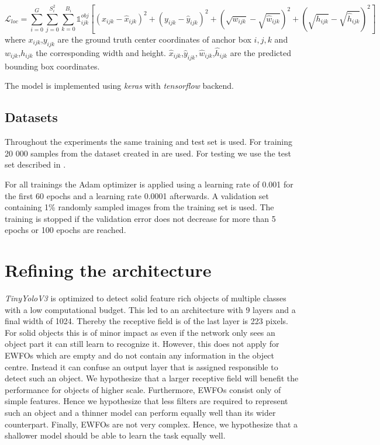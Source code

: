 	\begin{equation}
		\mathcal{L}_{loc} = \sum_{i=0}^{G} \sum_{j=0}^{S_i^2}\sum_{k=0}^{B_i} \mathbb{1}_{ijk}^{obj}[(x_{ijk}-\hat{x}_{ijk})^2 + (y_{ijk}-\hat{y}_{ijk})^2  + (\sqrt{w_{ijk}}-\sqrt{\hat{w}_{ijk}})^2 +(\sqrt{h_{ijk}}-\sqrt{\hat{h}_{ijk}})^2 ]
	\end{equation}
	where $x_{ijk}$,$y_{ijk}$ are the ground truth center coordinates of anchor box $i,j,k$ and $w_{ijk}$,$h_{ijk}$ the corresponding width and height. $\hat x_{ijk}$,$\hat y_{ijk}, \hat w_{ijk}$,$\hat h_{ijk}$ are the predicted bounding box coordinates. 
	
	The model is implemented using \textit{keras} with \textit{tensorflow} backend. 
	
	\subsection{Datasets}
	
	Throughout the experiments the same training and test set is used. For training 20 000 samples from the dataset created in  are used. For testing we use the test set described in .

	For all trainings the Adam optimizer is applied using a learning rate of 0.001 for the first 60 epochs and a learning rate 0.0001 afterwards. A validation set containing 1\% randomly sampled images from the training set is used. The training is stopped if the validation error does not decrease for more than 5 epochs or 100 epochs are reached.
	
		\section{Refining the architecture}
	
	\textit{TinyYoloV3} is optimized to detect solid feature rich objects of multiple classes with a low computational budget. This led to an architecture with 9 layers and a final width of 1024. Thereby the receptive field is of the last layer is 223 pixels. For solid objects this is of minor impact as even if the network only sees an object part it can still learn to recognize it. However, this does not apply for \acp{EWFO} which are empty and do not contain any information in the object centre. Instead it can confuse an output layer that is assigned responsible to detect such an object. We hypothesize that a larger receptive field will benefit the performance for objects of higher scale. Furthermore, \acp{EWFO} consist only of simple features. Hence we hypothesize that less filters are required to represent such an object and a thinner model can perform equally well than its wider counterpart. Finally, \acp{EWFO} are not very complex. Hence, we hypothesize that a shallower model should be able to learn the task equally well.
	
